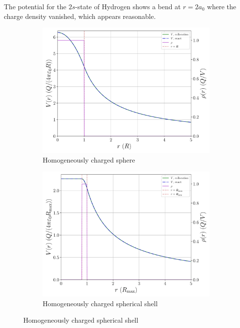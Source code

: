 \documentclass[a4paper,DIV=12,english]{scrartcl}
\begin{document}
The potential for the $2s$-state of Hydrogen shows a bend at $r=2a_0$ where the charge density vanished, which appears reasonable.
\begin{figure}
    \centering
    \begin{subfigure}{0.49\textwidth}
        \centering
        \includegraphics[width=\textwidth]{../plots/potential/potential_solidsphere_test.pdf}
        \caption{Homogeneously charged sphere}
        \label{subfig:sph}
    \end{subfigure}
    \begin{subfigure}{0.49\textwidth}
        \centering
        \includegraphics[width=\textwidth]{../plots/potential/potential_shell_test.pdf}
        \caption{Homogeneously charged spherical shell}

\end{subfigure}
\end{figure}
\end{document}
